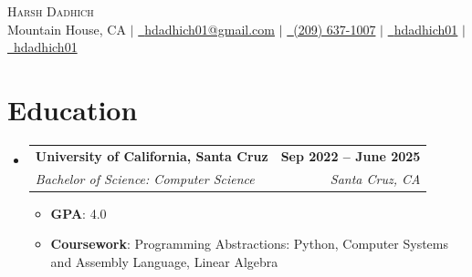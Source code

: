 \documentclass[letterpaper,11pt]{article}
\makeatletter
\newcommand{\resumeSubheading}[4]{
  \vspace{-2pt}\item
    \begin{tabular*}{1.0\textwidth}[t]{l@{\extracolsep{\fill}}r}
      \textbf{#1} & \textbf{\small #2} \\
      \textit{\small#3} & \textit{\small #4} \\
    \end{tabular*}\vspace{-7pt}
}
\newcommand{\resumeSubHeadingListStart}{\begin{itemize}[leftmargin=0.0in, label={}]}
\newcommand{\resumeSubHeadingListEnd}{\end{itemize}}
\makeatother
\begin{document}

\begin{center}
	{\Huge \scshape Harsh Dadhich} \\ \vspace{1pt}
	Mountain House, CA $|$ \color[HTML]{0000EE}\href{mailto:hdadhich01@gmail.com}{\faEnvelope~{hdadhich01@gmail.com}} \textcolor{black}{$|$} \color[HTML]{0000EE}\href{tel:+12096371007}{\small \raisebox{-0.1\height}\faPhone~{(209) 637-1007}} \textcolor{black}{$|$} \color[HTML]{0000EE}\href{https://www.linkedin.com/in/hdadhich01/}{\faLinkedin~{hdadhich01}} \textcolor{black}{$|$} \color[HTML]{0000EE}\href{https://github.com/hdadhich01}{\faGithub~{hdadhich01}}
	\vspace{-10pt}
\end{center}

\section{Education}
\resumeSubHeadingListStart

\resumeSubheading
{University of California, Santa Cruz}{Sep 2022 -- June 2025}
{Bachelor of Science: Computer Science}{Santa Cruz, CA}
\begin{itemize}[itemsep=-1pt, parsep=1pt]
	\item\small \textbf{GPA}{: 4.0}
	\item \textbf{Coursework}{: Programming Abstractions: Python, Computer Systems and Assembly Language, Linear Algebra}
\end{itemize}

\resumeSubHeadingListEnd
\vspace{-10pt}
\end{document}
